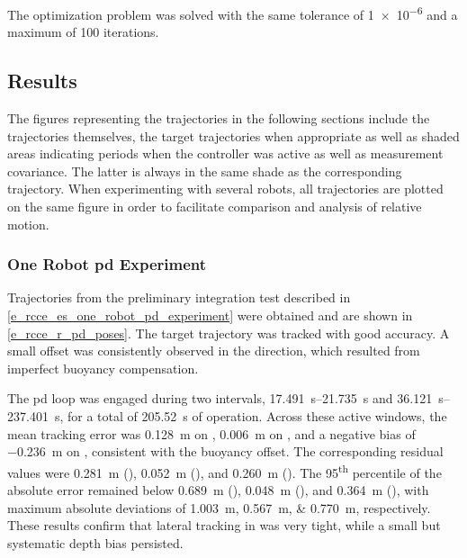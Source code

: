 The optimization problem was solved with the same tolerance of \num{1e-6} and a maximum of
\num{100} iterations.

\subsection{Results}
\label{e_rcce_results}

The figures representing the trajectories in the following sections include the trajectories
themselves, the target trajectories when appropriate as well as shaded areas indicating periods
when the controller was active as well as measurement covariance. The latter is always in the same
shade as the corresponding trajectory. When experimenting with several robots, all trajectories are
plotted on the same figure in order to facilitate comparison and analysis of relative motion.

\subsubsection{One Robot \acs{pd} Experiment} \label{e_rcce_r_single_bluerov_pd_experiment}

Trajectories from the preliminary integration test described in
\cref{e_rcce_es_one_robot_pd_experiment} were obtained and are shown in \cref{e_rcce_r_pd_poses}.
The target trajectory was tracked with good accuracy. A small offset was consistently observed in
the  direction, which resulted from imperfect buoyancy compensation.

The \acs{pd} loop was engaged during two intervals, \qtyrange{17.491}{21.735}{\second} and
\qtyrange{36.121}{237.401}{\second}, for a total of \qty{205.52}{\second} of operation. Across
these active windows, the mean tracking error was \qty{0.128}{\meter} on ,
\qty{0.006}{\meter} on , and a negative bias of \qty{-0.236}{\meter} on ,
consistent with the buoyancy offset. The corresponding residual values were \qty{0.281}{\meter}
(), \qty{0.052}{\meter} (), and \qty{0.260}{\meter} (). The
\num{95}\textsuperscript{th} percentile of the absolute error remained below \qty{0.689}{\meter}
(), \qty{0.048}{\meter} (), and \qty{0.364}{\meter} (), with
maximum absolute deviations of \qtylist{1.003;0.567;0.770}{\meter}, respectively. These results
confirm that lateral tracking in  was very tight, while a small but systematic depth
bias persisted.

